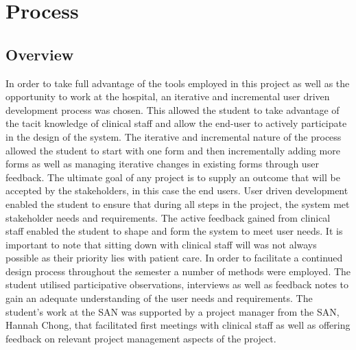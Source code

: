 \section{Process}
\subsection{Overview}
In order to take full advantage of the tools employed in this project as well as the opportunity to work at the hospital, an iterative and incremental user driven development process was chosen. This allowed the student to take advantage of the tacit knowledge of clinical staff and allow the end-user to actively participate in the design of the system. The iterative and incremental nature of the process allowed the student to start with one form and then incrementally adding more forms as well as managing iterative changes in existing forms through user feedback. The ultimate goal of any project is to supply an outcome that will be accepted by the stakeholders, in this case the end users. User driven development enabled the student to ensure that during all steps in the project, the system met stakeholder needs and requirements. The active feedback gained from clinical staff enabled the student to shape and form the system to meet user needs. It is important to note that sitting down with clinical staff will was not always possible as their priority lies with patient care. In order to facilitate a continued design process throughout the semester a number of methods were employed. The student utilised participative observations, interviews as well as feedback notes to gain an adequate understanding of the user needs and requirements. The student's work at the SAN was supported by a project manager from the SAN, Hannah Chong, that facilitated first meetings with clinical staff as well as offering feedback on relevant project management aspects of the project.

